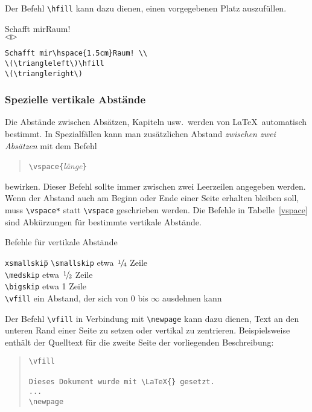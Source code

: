 Der Befehl \verb|\hfill| kann dazu dienen, einen vorgegebenen
Platz auszufüllen.
\exa
\raggedright
Schafft mir\hspace{1.5cm}Raum! \\
\(\triangleleft\)\hfill \(\triangleright\)\\
\exb
\begin{verbatim}
Schafft mir\hspace{1.5cm}Raum! \\
\(\triangleleft\)\hfill 
\(\triangleright\)
\end{verbatim}
\exc


\subsubsection{Spezielle vertikale Abstände} \label{vabstaende}
 
Die Abstände zwischen Absätzen, Kapiteln usw.\ werden von
\LaTeX\ automatisch bestimmt.
In Spezialfällen kann man zusätzlichen Abstand
\emph{zwischen zwei Absätzen} mit dem Befehl
\begin{verse}
\verb|\vspace{|\textit{länge}\verb|}|
\end{verse}
bewirken.
Dieser Befehl sollte immer zwischen zwei Leerzeilen angegeben
werden.
Wenn der Abstand auch am Beginn oder Ende einer Seite erhalten
bleiben soll, muss \verb|\vspace*| statt \verb|\vspace|
geschrieben werden.
Die Befehle in Tabelle~\ref{vspace} sind Abkürzungen für
bestimmte vertikale Abstände.
\begin{table}[t]
\caption{Befehle für vertikale Abstände} \label{vspace}
\oben{13cm}
\begin{tabbing}
\texttt{xsmallskip}\qquad \= \kill
\verb|\smallskip| \> etwa \(\nfrac{1}{4}\) Zeile \\
\verb|\medskip|   \> etwa \(\nfrac{1}{2}\) Zeile \\
\verb|\bigskip|   \> etwa 1 Zeile \\
\verb|\vfill|     \> ein Abstand, der sich von 0 bis \(\infty\)
                     ausdehnen kann
\end{tabbing}
\unten
\end{table}
Der Befehl \verb|\vfill| in Verbindung mit \verb|\newpage|
kann dazu dienen, Text an den unteren Rand einer Seite zu setzen
oder vertikal zu zentrieren.  Beispielsweise enthält der Quelltext
für die zweite Seite der vorliegenden Beschreibung:
\begin{quote}
\begin{verbatim}
\vfill

Dieses Dokument wurde mit \LaTeX{} gesetzt.
...
\newpage
\end{verbatim}
\end{quote}
 
